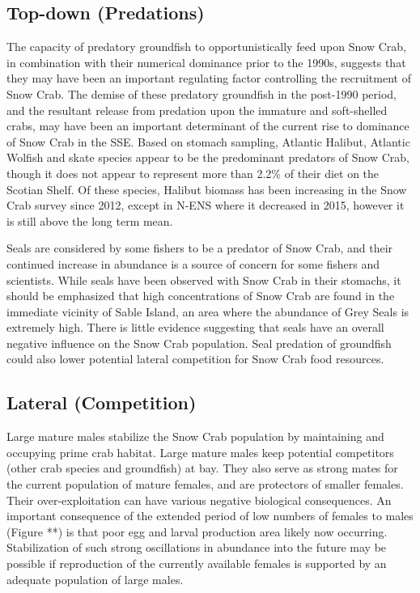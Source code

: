 \documentclass[paper=a4, fontsize=11pt]{article}
\begin{document}
\subsection{Top-down (Predations)}

The capacity of predatory groundfish to opportunistically feed upon Snow Crab, in combination with their numerical dominance prior to the 1990s, suggests that they may have been an important regulating factor controlling the recruitment of Snow Crab. The demise of these predatory groundfish in the post-1990 period, and the resultant release from predation upon the immature and soft-shelled crabs, may have been an important determinant of the current rise to dominance of Snow Crab in the SSE. Based on stomach sampling, Atlantic Halibut, Atlantic Wolfish and skate species appear to be the predominant predators of Snow Crab, though it does not appear to represent more than 2.2\% of their diet on the Scotian Shelf. Of these species, Halibut biomass has been increasing in the Snow Crab survey since 2012, except in N-ENS where it decreased in 2015, however it is still above the long term mean. 

Seals are considered by some fishers to be a predator of Snow Crab, and their continued increase in abundance is a source of concern for some fishers and scientists. While seals have been observed with Snow Crab in their stomachs, it should be emphasized that high concentrations of Snow Crab are found in the immediate vicinity of Sable Island, an area where the abundance of Grey Seals is extremely high. There is little evidence suggesting that seals have an overall negative influence on the Snow Crab population. Seal predation of groundfish could also lower potential lateral competition for Snow Crab food resources. 

\subsection{Lateral (Competition)}

Large mature males stabilize the Snow Crab population by maintaining and occupying prime crab habitat. Large mature males keep potential competitors (other crab species and groundfish) at bay. They also serve as strong mates for the current population of mature females, and are protectors of smaller females. Their over-exploitation can have various negative biological consequences. An important consequence of the extended period of low numbers of females to males (Figure **) is that poor egg and larval production area likely now occurring. Stabilization of such strong oscillations in abundance into the future may be possible if reproduction of the currently available females is supported by an adequate population of large males. 
\end{document}
